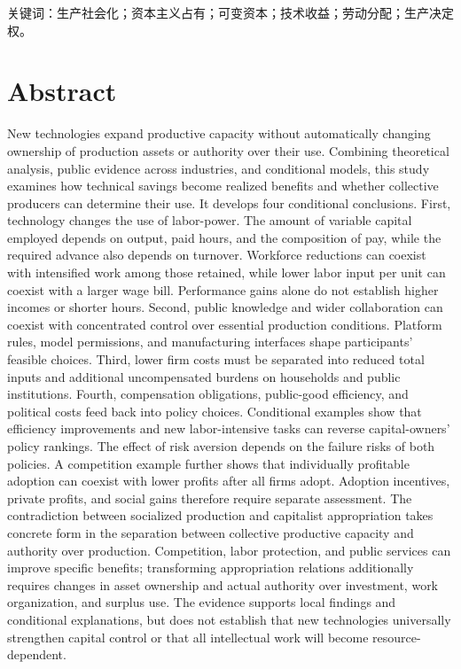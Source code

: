 \documentclass[UTF8,fontset=windows,12pt,a4paper,oneside,openany]{ctexbook}
\begin{document}
关键词：生产社会化；资本主义占有；可变资本；技术收益；劳动分配；生产决定权。

\section*{Abstract}

New technologies expand productive capacity without automatically changing ownership of production assets or authority over their use. Combining theoretical analysis, public evidence across industries, and conditional models, this study examines how technical savings become realized benefits and whether collective producers can determine their use. It develops four conditional conclusions. First, technology changes the use of labor-power. The amount of variable capital employed depends on output, paid hours, and the composition of pay, while the required advance also depends on turnover. Workforce reductions can coexist with intensified work among those retained, while lower labor input per unit can coexist with a larger wage bill. Performance gains alone do not establish higher incomes or shorter hours. Second, public knowledge and wider collaboration can coexist with concentrated control over essential production conditions. Platform rules, model permissions, and manufacturing interfaces shape participants' feasible choices. Third, lower firm costs must be separated into reduced total inputs and additional uncompensated burdens on households and public institutions. Fourth, compensation obligations, public-good efficiency, and political costs feed back into policy choices. Conditional examples show that efficiency improvements and new labor-intensive tasks can reverse capital-owners' policy rankings. The effect of risk aversion depends on the failure risks of both policies. A competition example further shows that individually profitable adoption can coexist with lower profits after all firms adopt. Adoption incentives, private profits, and social gains therefore require separate assessment. The contradiction between socialized production and capitalist appropriation takes concrete form in the separation between collective productive capacity and authority over production. Competition, labor protection, and public services can improve specific benefits; transforming appropriation relations additionally requires changes in asset ownership and actual authority over investment, work organization, and surplus use. The evidence supports local findings and conditional explanations, but does not establish that new technologies universally strengthen capital control or that all intellectual work will become resource-dependent.
\end{document}
